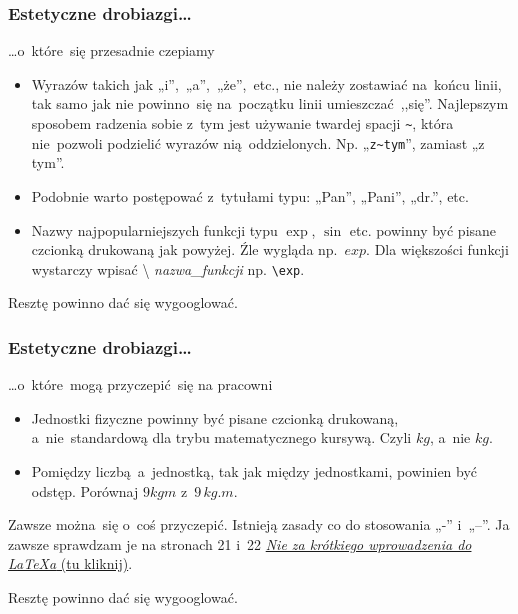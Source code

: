 \documentclass[10pt,t]{beamer}
\begin{document}
\begin{frame}[fragile]
  \frametitle{Estetyczne drobiazgi\ldots}


  \ldots o~które~się przesadnie czepiamy
  \begin{itemize}
    \RaggedRight

  \item Wyrazów takich jak „i”,~„a”,~„że”,~etc., nie należy
    zostawiać na~końcu linii, tak samo jak nie powinno~się
    na~początku linii umieszczać~,,się''. Najlepszym sposobem
    radzenia sobie z~tym jest używanie twardej spacji \verb+~+,
    która nie~pozwoli podzielić wyrazów nią~oddzielonych. Np.
    „\verb+z~tym+”, zamiast „z tym”.

  \item Podobnie warto postępować z~tytułami typu: „Pan”,
    „Pani”, „dr.”, etc.

  \item Nazwy najpopularniejszych funkcji typu $\exp$, $\sin$
    etc. powinny być pisane czcionką drukowaną jak powyżej. Źle
    wygląda np.~$exp$. Dla większości funkcji wystarczy wpisać \textbackslash
    \textit{nazwa\_{}funkcji} np. \verb+\exp+.

  \end{itemize}



  Resztę powinno dać się {\color{red} wygooglować}.

\end{frame}





\begin{frame}[fragile]
  \frametitle{Estetyczne drobiazgi\ldots}


  \ldots o~które~mogą przyczepić~się na pracowni
  \begin{itemize}
    \RaggedRight

  \item Jednostki fizyczne powinny być pisane czcionką drukowaną,
    a~nie~standardową dla trybu matematycznego kursywą.
    Czyli $\si{kg}$, a~nie $kg$.

  \item Pomiędzy liczbą~a~jednostką, tak jak między jednostkami,
    powinien być odstęp. Porównaj $9 \si{kgm}$ z~$9 \, \si{kg.m}$.

  \end{itemize}



  Zawsze można~się o~coś przyczepić. Istnieją zasady co do stosowania „-”
  i~„--”. Ja zawsze sprawdzam je na stronach 21 i~22
  \href{ftp://ftp.gust.org.pl/pub/CTAN/info/lshort/polish/lshort2e.pdf}
  {\textit{Nie za krótkiego wprowadzenia do \LaTeX a} (tu kliknij)}.

  Resztę powinno dać się {\color{yellow} wygooglować}.

\end{frame}
\end{document}
